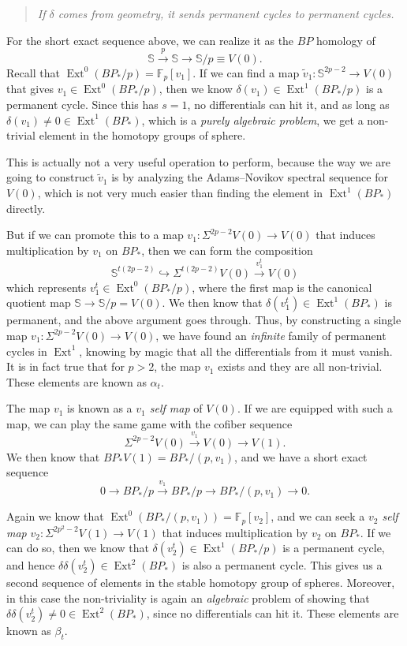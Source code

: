 \documentclass{shortart}
\theoremstyle{definition}
\newcommand\F{\mathbb{F}}
\renewcommand\S{\mathbb{S}}
\DeclareMathOperator\Ext{Ext}
\begin{document}
\begin{quote}
  \emph{If $\delta$ comes from geometry, it sends permanent cycles to permanent cycles.}
\end{quote}

For the short exact sequence above, we can realize it as the $BP$ homology of 
\[
  \S \overset{p}{\longrightarrow} \S \longrightarrow \S/p \equiv V(0).
\]
Recall that $\Ext^0(BP_*/p) = \F_p[v_1]$. If we can find a map $\tilde{v}_1: \S^{2p - 2} \to V(0)$ that gives $v_1 \in \Ext^0(BP_*/p)$, then we know $\delta (v_1) \in \Ext^1(BP_*/p)$ is a permanent cycle. Since this has $s = 1$, no differentials can hit it, and as long as $\delta (v_1) \not= 0 \in \Ext^1(BP_*)$, which is a \emph{purely algebraic problem}, we get a non-trivial element in the homotopy groups of sphere.

This is actually not a very useful operation to perform, because the way we are going to construct $\tilde{v}_1$ is by analyzing the Adams--Novikov spectral sequence for $V(0)$, which is not very much easier than finding the element in $\Ext^1(BP_*)$ directly.

But if we can promote this to a map $v_1: \Sigma^{2p - 2} V(0) \to V(0)$ that induces multiplication by $v_1$ on $BP_*$, then we can form the composition
\[
  \S^{t (2p - 2)} \hookrightarrow \Sigma^{t(2p - 2)} V(0) \overset{v_1^t}{\longrightarrow} V(0)
\]
which represents $v_1^t \in  \Ext^0(BP_*/p)$, where the first map is the canonical quotient map $\S \to \S/p = V(0)$. We then know that $\delta(v_1^t) \in \Ext^1(BP_*)$ is permanent, and the above argument goes through. Thus, by constructing a single map $v_1: \Sigma^{2p - 2} V(0) \to V(0)$, we have found an \emph{infinite} family of permanent cycles in $\Ext^1$, knowing by magic that all the differentials from it must vanish. It is in fact true that for $p > 2$, the map $v_1$ exists and they are all non-trivial. These elements are known as $\alpha_t$.

The map $v_1$ is known as a \emph{$v_1$ self map} of $V(0)$. If we are equipped with such a map, we can play the same game with the cofiber sequence
\[
  \Sigma^{2p - 2} V(0) \overset{v_1}{\longrightarrow} V(0) \to V(1).
\]
We then know that $BP_* V(1) = BP_*/(p, v_1)$, and we have a short exact sequence
\[
  0 \longrightarrow BP_*/p \overset{v_1}{\longrightarrow} BP_*/p \longrightarrow BP_*/(p, v_1) \longrightarrow 0.
\]

Again we know that $\Ext^0(BP_*/(p, v_1)) = \F_p[v_2]$, and we can seek a \emph{$v_2$ self map} $v_2: \Sigma^{2p^2 - 2} V(1) \to V(1)$ that induces multiplication by $v_2$ on $BP_*$. If we can do so, then we know that $\delta (v_2^t) \in \Ext^1(BP_*/p)$ is a permanent cycle, and hence $\delta \delta (v_2^t) \in \Ext^2(BP_*)$ is also a permanent cycle. This gives us a second sequence of elements in the stable homotopy group of spheres. Moreover, in this case the non-triviality is again an \emph{algebraic} problem of showing that $\delta \delta (v_2^t) \not= 0 \in \Ext^2(BP_*)$, since no differentials can hit it. These elements are known as $\beta_t$.
\end{document}
